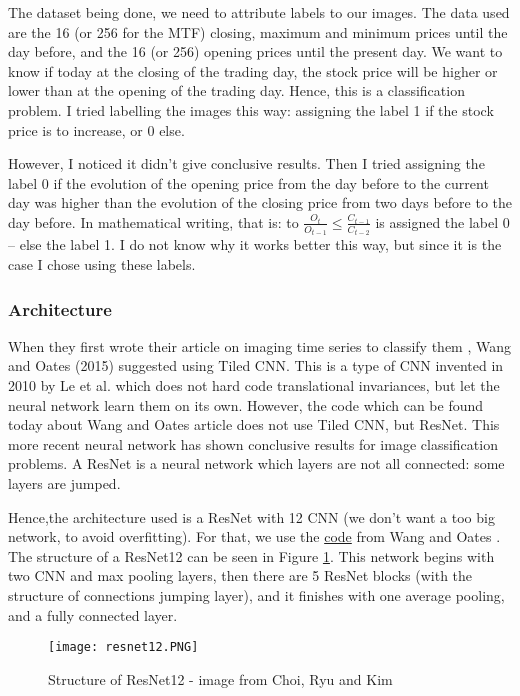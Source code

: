 \documentclass[11pt]{article}
\begin{document}
\begin{onehalfspace}
The dataset being done, we need to attribute labels to our images. The data used are the 16 (or 256 for the MTF) closing, maximum and minimum prices until the day before, and the 16 (or 256) opening prices until the present day. We want to know if today at the closing of the trading day, the stock price will be higher or lower than at the opening of the trading day. Hence, this is a classification problem. I tried labelling the images this way: assigning the label 1 if the stock price is to increase, or 0 else.

However, I noticed it didn't give conclusive results. Then I tried assigning the label 0 if the evolution of the opening price from the day before to the current day was higher than the evolution of the closing price from two days before to the day before. In mathematical writing, that is: to $\frac{O_t}{O_{t-1}} \leq \frac{C_{t-1}}{C_{t-2}}$ is assigned the label 0 -- else the label 1. I do not know why it works better this way, but since it is the case I chose using these labels. 


\subsubsection{Architecture}

When they first wrote their article on imaging time series to classify them \cite{wang}, Wang and Oates (2015) suggested using Tiled CNN. This is a type of CNN invented in 2010 \cite{le} by Le et al. which does not hard code translational invariances, but let the neural network learn them on its own. However, the code which can be found today about Wang and Oates article does not use Tiled CNN, but ResNet. This more recent neural network has shown conclusive results for image classification problems. A ResNet is a neural network which layers are not all connected: some layers are jumped. 

Hence,the architecture used is a ResNet with 12 CNN (we don't want a too big network, to avoid overfitting). For that, we use the \href{https://github.com/cauchyturing/UCR_Time_Series_Classification_Deep_Learning_Baseline/blob/master/ResNet.py}{code} from Wang and Oates \cite{wang}. The structure of a ResNet12 can be seen in Figure \ref{fig:resnet12}. This network begins with two CNN and max pooling layers, then there are 5 ResNet blocks (with the structure of connections jumping layer), and it finishes with one average pooling, and a fully connected layer.

\begin{figure}[h!]
     \centering
     \captionsetup{justification=centering}
     \texttt{[image: resnet12.PNG]}
     \caption{Structure of ResNet12 - image from Choi, Ryu and Kim \cite{choi}}
\label{fig:resnet12}
\end{figure}


\end{onehalfspace}
\end{document}
